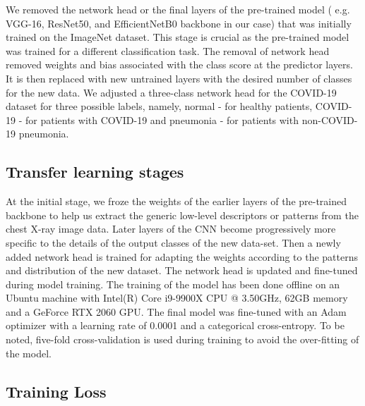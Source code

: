 We removed the network head or the final layers of the pre-trained model ( e.g. VGG-16, ResNet50, and EfficientNetB0 backbone in our case) that was initially trained on the ImageNet dataset. This stage is crucial as the pre-trained model was trained for a different classification task. The removal of network head removed weights and bias associated with the class score at the predictor layers.
It is then replaced with new untrained layers with the desired number of classes for the new data. We adjusted a three-class network head for the COVID-19 dataset for three possible labels, namely, normal - for healthy patients, COVID-19 - for patients with COVID-19 and pneumonia - for patients with non-COVID-19 pneumonia. 





\subsection{Transfer learning stages}
 At the initial stage, we froze the weights of the earlier layers of the pre-trained backbone to help us extract the generic low-level descriptors or patterns from the chest X-ray image data. Later layers of the CNN become progressively more specific to the details of the output classes of the new data-set. Then a newly added network head is trained for adapting the weights according to the patterns and distribution of the new dataset. The network head is updated and fine-tuned during model training. The training of the model has been done offline on an Ubuntu machine with Intel(R) Core i9-9900X CPU @ 3.50GHz, 62GB memory and a GeForce RTX 2060 GPU. The final model was fine-tuned with an Adam optimizer with a learning rate of 0.0001 and a categorical cross-entropy. To be noted, five-fold cross-validation is used during training to avoid the over-fitting of the model. 

\subsection{Training Loss}


